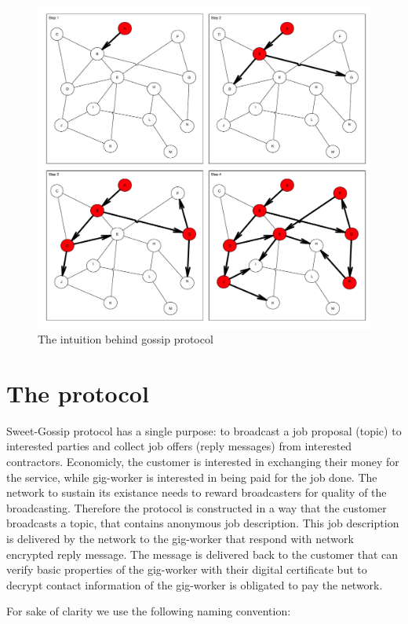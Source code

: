 \documentclass{article}
\begin{document}
\begin{figure}
	\centering
	\includegraphics[scale=0.4]{network.pdf}
	\caption{The intuition behind gossip protocol}
	\label{fig:network}
\end{figure}

\section{The protocol}

Sweet-Gossip protocol has a single purpose: to broadcast a job proposal (topic) to interested parties and collect job offers (reply messages) from interested contractors. Economicly, the customer is interested in exchanging their money for the service, while gig-worker is interested in being paid for the job done. The network to sustain its existance needs to reward broadcasters for quality of the broadcasting. Therefore the protocol is constructed in a way that the customer broadcasts a topic, that contains anonymous job description. This job description is delivered by the network to the gig-worker that respond with network encrypted reply message. The message is delivered back to the customer that can verify basic properties of the gig-worker with their digital certificate but to decrypt contact information of the gig-worker is obligated to pay the network.

For sake of clarity we use the following naming convention:
\end{document}
